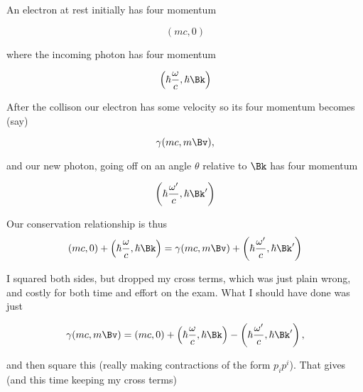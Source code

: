 An electron at rest initially has four momentum

\begin{equation}\label{eqn:relativisticElectrodynamicsExamReflection:310}
(m c, 0)
\end{equation}

where the incoming photon has four momentum

\begin{equation}\label{eqn:relativisticElectrodynamicsExamReflection:330}
\left(\hbar \frac{\omega}{c}, \hbar \Bk \right)
\end{equation}

After the collison our electron has some velocity so its four momentum becomes (say)

\begin{equation}\label{eqn:relativisticElectrodynamicsExamReflection:350}
\gamma (m c, m \Bv),
\end{equation}

and our new photon, going off on an angle $\theta$ relative to $\Bk$ has four momentum

\begin{equation}\label{eqn:relativisticElectrodynamicsExamReflection:370}
\left(\hbar \frac{\omega'}{c}, \hbar \Bk' \right)
\end{equation}

Our conservation relationship is thus
\begin{equation}\label{eqn:relativisticElectrodynamicsExamReflection:390}
(m c, 0) + \left(\hbar \frac{\omega}{c}, \hbar \Bk \right)
=
\gamma (m c, m \Bv)
+
\left(\hbar \frac{\omega'}{c}, \hbar \Bk' \right)
\end{equation}

I squared both sides, but dropped my cross terms, which was just plain wrong, and costly for both time and effort on the exam.  What I should have done was just

\begin{equation}\label{eqn:relativisticElectrodynamicsExamReflection:410}
\gamma (m c, m \Bv) =
(m c, 0) + \left(\hbar \frac{\omega}{c}, \hbar \Bk \right)
-\left(\hbar \frac{\omega'}{c}, \hbar \Bk' \right),
\end{equation}

and then square this (really making contractions of the form $p_i p^i$).  That gives (and this time keeping my cross terms)

